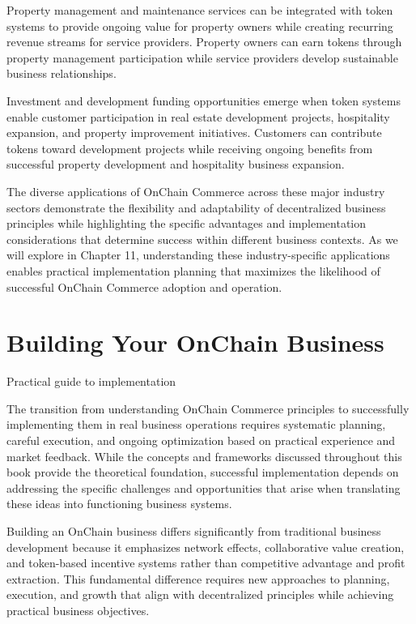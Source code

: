 \documentclass[
  Letterpaper,
]{scrbook}
\begin{document}
Property management and maintenance services can be integrated with
token systems to provide ongoing value for property owners while
creating recurring revenue streams for service providers. Property
owners can earn tokens through property management participation while
service providers develop sustainable business relationships.

Investment and development funding opportunities emerge when token
systems enable customer participation in real estate development
projects, hospitality expansion, and property improvement initiatives.
Customers can contribute tokens toward development projects while
receiving ongoing benefits from successful property development and
hospitality business expansion.

The diverse applications of OnChain Commerce across these major industry
sectors demonstrate the flexibility and adaptability of decentralized
business principles while highlighting the specific advantages and
implementation considerations that determine success within different
business contexts. As we will explore in Chapter 11, understanding these
industry-specific applications enables practical implementation planning
that maximizes the likelihood of successful OnChain Commerce adoption
and operation.

\chapter{Building Your OnChain Business}\label{sec-building-business}

Practical guide to implementation

The transition from understanding OnChain Commerce principles to
successfully implementing them in real business operations requires
systematic planning, careful execution, and ongoing optimization based
on practical experience and market feedback. While the concepts and
frameworks discussed throughout this book provide the theoretical
foundation, successful implementation depends on addressing the specific
challenges and opportunities that arise when translating these ideas
into functioning business systems.

Building an OnChain business differs significantly from traditional
business development because it emphasizes network effects,
collaborative value creation, and token-based incentive systems rather
than competitive advantage and profit extraction. This fundamental
difference requires new approaches to planning, execution, and growth
that align with decentralized principles while achieving practical
business objectives.
\end{document}
